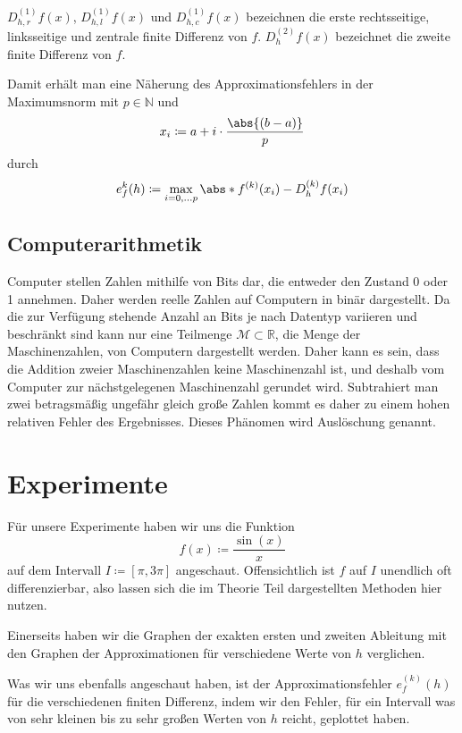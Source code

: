 \documentclass{scrartcl}
\newcommand{\field}[1]{\mathbb{#1}}
\newcommand{\nats}{\field{N}}
\newcommand{\reals}{\field{R}}
\theoremstyle{remark}
\begin{document}
\(D_{h, r}^{(1)} f(x)\), \(D_{h, l}^{(1)} f(x)\) und \(D_{h, c}^{(1)} f(x)\)
bezeichnen die erste rechtsseitige, linksseitige und zentrale finite Differenz von \(f\).
\(D_{h}^{(2)} f(x)\) bezeichnet die zweite finite Differenz von \(f\).

Damit erhält man eine Näherung des Approximationsfehlers in der Maximumsnorm
mit \(p \in \nats\) und
\[
    x_{i} \coloneq a + i \cdot \frac{\abs{(b - a)}}{p}
\]
durch
\[
    e_f^k(h) \coloneq \max_{i = 0, \dots p} \abs*{f^{(k)}(x_i) - D_h^{(k)} f(x_i)}
\] %

\subsection{Computerarithmetik}


Computer stellen Zahlen mithilfe von Bits dar, die entweder den Zustand 0 oder
1 annehmen. Daher werden reelle Zahlen auf Computern in binär dargestellt. Da
die zur Verfügung stehende Anzahl an Bits je nach Datentyp variieren und
beschränkt sind kann nur eine Teilmenge \(\mathcal{M} \subset \reals\), die
Menge der Maschinenzahlen, von Computern dargestellt werden. Daher kann es
sein, dass die Addition zweier Maschinenzahlen keine Maschinenzahl ist, und
deshalb vom Computer zur nächstgelegenen Maschinenzahl gerundet wird.
Subtrahiert man zwei betragsmäßig ungefähr gleich große Zahlen kommt es daher
zu einem hohen relativen Fehler des Ergebnisses. Dieses Phänomen wird
Auslöschung genannt.

\section{Experimente}
Für unsere Experimente haben wir uns die Funktion
\[
    f(x) \coloneq \frac{\sin(x)}{x}
\]
auf dem Intervall \(I \coloneq [\pi, 3 \pi]\) angeschaut. Offensichtlich ist
  \(f\) auf \(I\) unendlich oft differenzierbar, also lassen sich die im
  Theorie Teil dargestellten Methoden hier nutzen.

Einerseits haben wir die Graphen der exakten ersten und zweiten Ableitung mit
den Graphen der Approximationen für verschiedene Werte von \(h\) verglichen.


Was wir uns ebenfalls angeschaut haben, ist der Approximationsfehler
\(e_{f}^{(k)}(h)\) für die verschiedenen finiten Differenz, indem wir den
Fehler, für ein Intervall was von sehr kleinen bis zu sehr großen Werten von
\(h\) reicht, geplottet haben.
\end{document}
